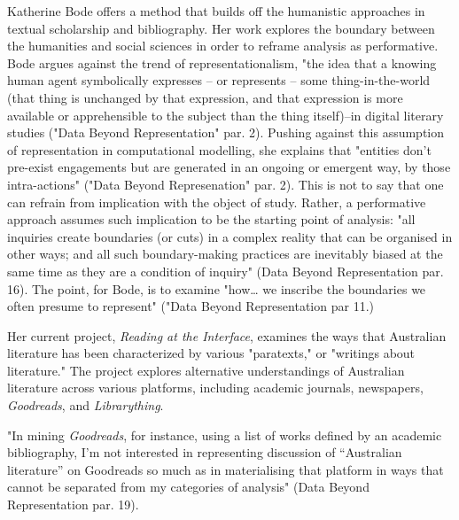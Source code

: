 \documentclass[11pt]{article}
\begin{document}
Katherine Bode offers a method that builds off the humanistic
approaches in textual scholarship and bibliography. Her work explores
the boundary between the humanities and social sciences in order to
reframe analysis as performative. Bode argues against the trend of
representationalism, "the idea that a knowing human agent symbolically
expresses – or represents – some thing-in-the-world (that thing is
unchanged by that expression, and that expression is more available or
apprehensible to the subject than the thing itself)--in digital
literary studies ("Data Beyond Representation" par. 2). Pushing
against this assumption of representation in computational modelling,
she explains that "entities don’t pre-exist engagements but are
generated in an ongoing or emergent way, by those intra-actions"
("Data Beyond Represenation" par. 2). This is not to say that one can
refrain from implication with the object of study. Rather, a
performative approach assumes such implication to be the starting
point of analysis: "all inquiries create boundaries (or cuts) in a
complex reality that can be organised in other ways; and all such
boundary-making practices are inevitably biased at the same time as
they are a condition of inquiry" (Data Beyond Representation
par. 16). The point, for Bode, is to examine "how\ldots{} we inscribe the
boundaries we often presume to represent" ("Data Beyond Representation
par 11.)

Her current project, \emph{Reading at the Interface}, examines the ways
that Australian literature has been characterized by various
"paratexts," or "writings about literature." The project explores
alternative understandings of Australian literature across various
platforms, including academic journals, newspapers, \emph{Goodreads}, and
\emph{Librarything}.


"In mining \emph{Goodreads}, for instance, using a list of works defined by
an academic bibliography, I’m not interested in representing
discussion of “Australian literature” on Goodreads so much as in
materialising that platform in ways that cannot be separated from my
categories of analysis" (Data Beyond Representation par. 19).
\end{document}
